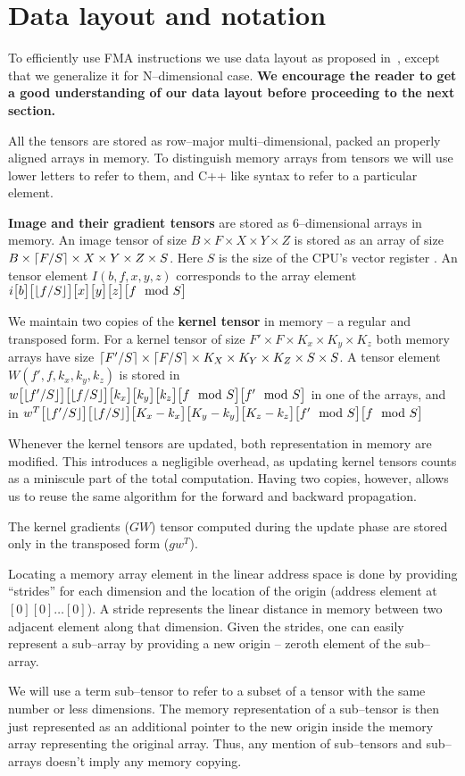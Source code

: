 \section{Data layout and notation}

  To efficiently use FMA instructions we use data layout as proposed
  in~\cite{jeffers2016knl, cpu-myth}, except that we generalize it for
  N--dimensional case.  {\bf We encourage the reader to get a good
    understanding of our data layout before proceeding to the next
    section.}

  All the tensors are stored as row--major multi--dimensional, packed
  an properly aligned arrays in memory.  To distinguish memory arrays
  from tensors we will use lower letters to refer to them, and C++
  like syntax to refer to a particular element.

  {\bf Image and their gradient tensors} are stored as 6--dimensional
  arrays in memory.  An image tensor of size $B \times F \times X
  \times Y \times Z$ is stored as an array of size $B \times
  \lceil F/S\rceil \times X \times Y \times Z \times S$.  Here $S$ is the
  size of the CPU's vector register .  An tensor element
  $I(b,f,x,y,z)$ corresponds to the array element
  $i\big[b\big]\big[\lfloor f/S\rfloor\big]\big[x\big]\big[y\big]\big[z\big]\big[f\mod S\big]$

  We maintain two copies of the {\bf kernel tensor} in memory -- a
  regular and transposed form.  For a kernel tensor of size $F' \times
  F \times K_x \times K_y \times K_z$ both memory arrays have size
  $\lceil F'/S\rceil \times \lceil F/S\rceil \times K_X \times K_Y \times K_Z
  \times S \times S$.  A tensor element $W(f',f,k_x,k_y,k_z)$ is
  stored in $w\big[\lfloor f'/S\rfloor\big]
  \big[\lfloor f/S\rfloor\big]\big[k_x\big]\big[k_y\big]\big[k_z\big]\big[f\mod S\big]\big[f'
    \mod S\big]$ in one of the arrays, and in $w^T\big[\lfloor f'/S\rfloor\big]
  \big[\lfloor f/S\rfloor\big]\big[K_x-k_x\big]\big[K_y-k_y\big]\big[K_z-k_z\big]\big[f'\mod
    S\big]\big[f\mod S\big]$

  Whenever the kernel tensors are updated, both representation in
  memory are modified.  This introduces a negligible overhead, as
  updating kernel tensors counts as a miniscule part of the total
  computation.  Having two copies, however, allows us to reuse the
  same algorithm for the forward and backward propagation.

  The kernel gradients ($GW$) tensor computed during the update phase
  are stored only in the transposed form ($gw^T$).

  Locating a memory array element in the linear address space is done
  by providing ``strides'' for each dimension and the location of the
  origin (address element at $[0][0]\dots[0]$).  A stride represents
  the linear distance in memory between two adjacent element along
  that dimension.  Given the strides, one can easily represent a
  sub--array by providing a new origin -- zeroth element of the
  sub--array.

  We will use a term sub--tensor to refer to a subset of a tensor with
  the same number or less dimensions.  The memory representation of a
  sub--tensor is then just represented as an additional pointer to the
  new origin inside the memory array representing the original array.
  Thus, any mention of sub--tensors and sub--arrays doesn't imply any
  memory copying.
